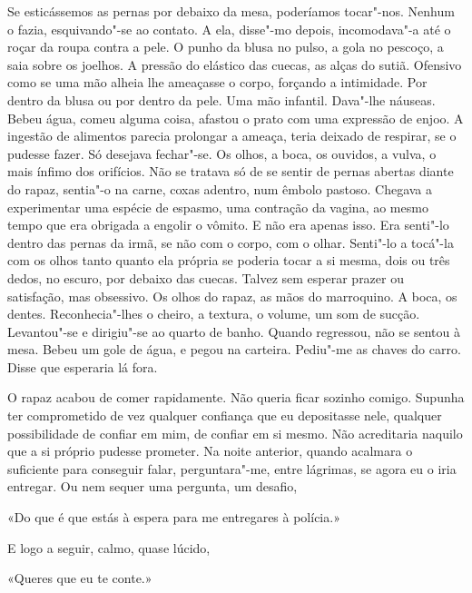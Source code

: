 Se esticássemos as pernas por debaixo da mesa, poderíamos tocar"-nos.
Nenhum o fazia, esquivando"-se ao contato. A ela, disse"-mo depois,
incomodava"-a até o roçar da roupa contra a pele. O punho da blusa no
pulso, a gola no pescoço, a saia sobre os joelhos. A pressão do elástico
das cuecas, as alças do sutiã. Ofensivo como se uma mão alheia lhe
ameaçasse o corpo, forçando a intimidade. Por dentro da blusa ou por
dentro da pele. Uma mão infantil. Dava"-lhe náuseas. Bebeu água, comeu
alguma coisa, afastou o prato com uma expressão de enjoo. A ingestão de
alimentos parecia prolongar a ameaça, teria deixado de respirar, se o
pudesse fazer. Só desejava fechar"-se. Os olhos, a boca, os ouvidos, a
vulva, o mais ínfimo dos orifícios. Não se tratava só de se sentir de
pernas abertas diante do rapaz, sentia"-o na carne, coxas adentro, num
êmbolo pastoso. Chegava a experimentar uma espécie de espasmo, uma
contração da vagina, ao mesmo tempo que era obrigada a engolir o
vômito. E não era apenas isso. Era senti"-lo dentro das pernas da irmã,
se não com o corpo, com o olhar. Senti"-lo a tocá"-la com os olhos tanto
quanto ela própria se poderia tocar a si mesma, dois ou três dedos, no
escuro, por debaixo das cuecas. Talvez sem esperar prazer ou satisfação,
mas obsessivo. Os olhos do rapaz, as mãos do marroquino. A boca, os
dentes. Reconhecia"-lhes o cheiro, a textura, o volume, um som de
sucção. Levantou"-se e dirigiu"-se ao quarto de banho. Quando regressou,
não se sentou à mesa. Bebeu um gole de água, e pegou na carteira.
Pediu"-me as chaves do carro. Disse que esperaria lá fora.

O rapaz acabou de comer rapidamente. Não queria ficar sozinho comigo.
Supunha ter comprometido de vez qualquer confiança que eu depositasse
nele, qualquer possibilidade de confiar em mim, de confiar em si mesmo.
Não acreditaria naquilo que a si próprio pudesse prometer. Na noite
anterior, quando acalmara o suficiente para conseguir falar,
perguntara"-me, entre lágrimas, se agora eu o iria entregar. Ou nem
sequer uma pergunta, um desafio,

«Do que é que estás à espera para me entregares à polícia.»

E logo a seguir, calmo, quase lúcido,

«Queres que eu te conte.»

